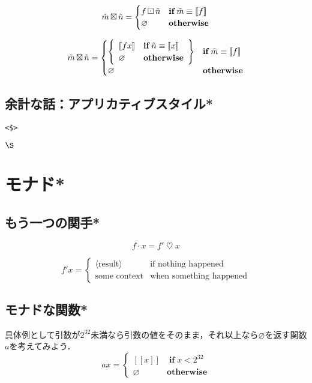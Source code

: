 \documentclass[twocolumn]{jsbook}
\def\[{[\![}
\def\]{]\!]}
\DeclareMathOperator{\hsklApplicativeMaybeMap}{\boxtimes}
\DeclareMathOperator{\hsklFmap}{\cdot}
\DeclareMathOperator{\hsklMaybeMap}{\boxdot}
\DeclareMathOperator{\hsklMonadMap}{\heartsuit}
\newcommand{\hsklNothing}{\varnothing}
\newcommand{\hsklJust}[1]{\[#1\]}
\newcommand{\hsklMaybe}[1]{\Tilde{#1}}
\newcommand{\mathKeyword}[1]{\mathbf{#1}}
\DeclareMathOperator{\mathIf}{\mathKeyword{if}}
\newcommand{\mathOtherwise}{\mathKeyword{otherwise}}
\newcommand{\code}[1]{\texttt{#1}}
\begin{document}
\begin{equation*}
\hsklMaybe{m}\hsklApplicativeMaybeMap\hsklMaybe{n}=\begin{cases}
f\hsklMaybeMap\hsklMaybe{n}&\mathIf\hsklMaybe{m}\equiv\hsklJust{f}\\
\hsklNothing&\mathOtherwise
\end{cases}
\end{equation*}

\begin{equation*}
\hsklMaybe{m}\hsklApplicativeMaybeMap\hsklMaybe{n}=\begin{cases}
\left\{
\begin{array}{ll}
\hsklJust{fx}&\mathIf\hsklMaybe{n}\equiv\hsklJust{x}\\
\hsklNothing&\mathOtherwise
\end{array}\right\}&\mathIf\hsklMaybe{m}\equiv\hsklJust{f}\\
\hsklNothing&\mathOtherwise
\end{cases}
\end{equation*}


\section*{余計な話：アプリカティブスタイル*}

\code{<\$>}

$\S$

\chapter{モナド*}

\section{もう一つの関手*}

$$f\hsklFmap x=f'\hsklMonadMap x$$

$$f'x=\begin{cases}\langle\text{result}\rangle&\text{if nothing happened}\\
\text{some context}&\text{when something happened}\end{cases}$$

\section{モナドな関数*}

具体例として引数が$2^{32}$未満なら引数の値をそのまま，それ以上なら$\hsklNothing$を返す関数$a$を考えてみよう．
\begin{equation*}
ax=\begin{cases}
\hsklJust{x}&\mathIf x<2^{32}\\
\hsklNothing&\mathOtherwise
\end{cases}
\end{equation*}
\end{document}
